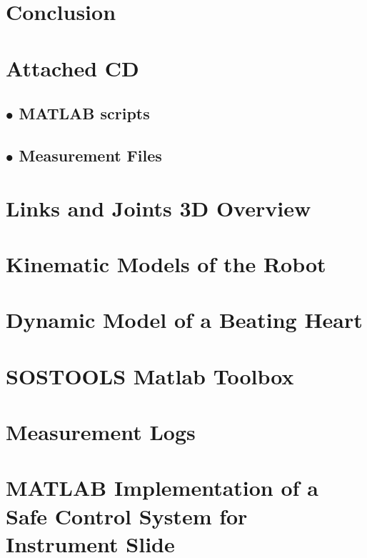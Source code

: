 \chapter{Conclusion}\label{chap:conclusion}


\begingroup
\raggedright
\clearpage
{}

\endgroup
\label{sourceliste}

\newpage

\begin{appendices}
\appendix
\renewcommand{\appendixname}{Appendix}
\renewcommand{\appendixtocname}{Appendix}

\chapter{Attached CD}\label{app:cd}
   \section*{$\bullet$ MATLAB scripts}
   \section*{$\bullet$ Measurement Files}



\chapter{Links and Joints 3D Overview}\label{app:links_joints_3d}


\chapter{Kinematic Models of the Robot}\label{app:kinematic_model_robot}


\chapter{Dynamic Model of a Beating Heart}\label{app:dynamic_model_heart}


\chapter{SOSTOOLS Matlab Toolbox}\label{app:sostools}


\chapter{Measurement Logs}\label{app:meas}


\chapter{MATLAB Implementation of a Safe Control System for Instrument Slide}\label{app:slide_implement_1}


\end{appendices}
